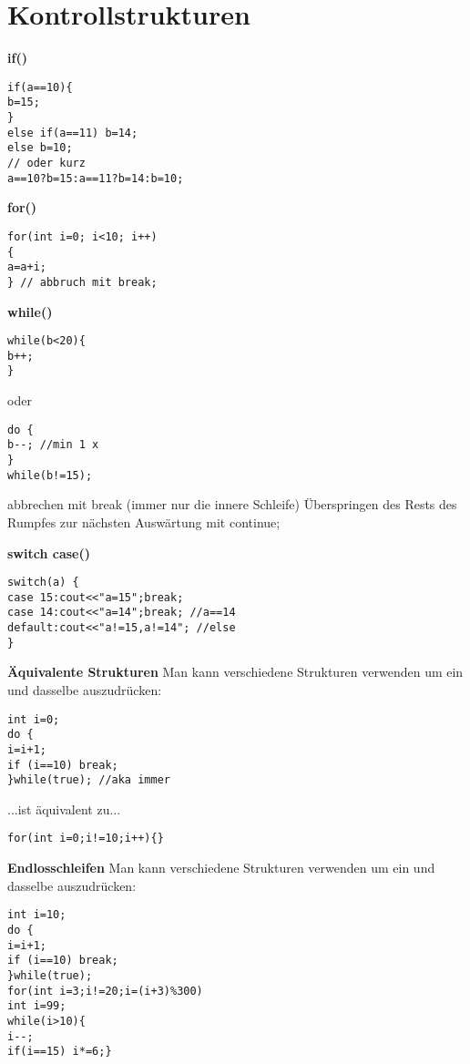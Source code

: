\section{Kontrollstrukturen}
\textbf{if()}
\begin{lstlisting}
if(a==10){
b=15;
}
else if(a==11) b=14;
else b=10;
// oder kurz
a==10?b=15:a==11?b=14:b=10;
\end{lstlisting}

\textbf{for()}
\begin{lstlisting}
for(int i=0; i<10; i++)
{
a=a+i;
} // abbruch mit break;
\end{lstlisting}

\textbf{while()}
\begin{multicols}{2}
	\begin{lstlisting}
while(b<20){
b++;
}	
	\end{lstlisting}
	oder
	\begin{lstlisting}
do {
b--; //min 1 x
}
while(b!=15);
	\end{lstlisting}
\end{multicols}
abbrechen mit break (immer nur die innere Schleife)
Überspringen des Rests des Rumpfes zur nächsten
Auswärtung mit continue;


\textbf{switch case()}
\begin{lstlisting}
switch(a) {
case 15:cout<<"a=15";break;
case 14:cout<<"a=14";break; //a==14
default:cout<<"a!=15,a!=14"; //else
}
\end{lstlisting}

\textbf{Äquivalente Strukturen}
Man kann verschiedene Strukturen verwenden um ein und dasselbe auszudrücken: 
\begin{lstlisting}
int i=0;
do {
i=i+1;
if (i==10) break;
}while(true); //aka immer
\end{lstlisting}
...ist äquivalent zu... 
\begin{lstlisting}
for(int i=0;i!=10;i++){} 
\end{lstlisting}


\textbf{Endlosschleifen}
Man kann verschiedene Strukturen verwenden um ein und dasselbe auszudrücken: 
\begin{lstlisting}
int i=10;
do {
i=i+1;
if (i==10) break;
}while(true);
for(int i=3;i!=20;i=(i+3)%300)
int i=99;
while(i>10){
i--;
if(i==15) i*=6;} 
\end{lstlisting}




